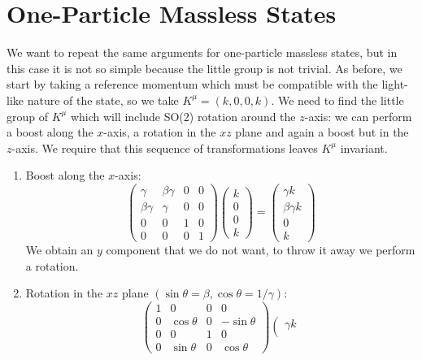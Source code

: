 \documentclass[../main.tex]{subfiles}
\begin{document}
\section{One-Particle Massless States}
We want to repeat the same arguments for one-particle massless states, but in this case it is not so simple because the little group is not trivial. As before, we start by taking a reference momentum which must be compatible with the light-like nature of the state, so we take $K^\mu=(k,0,0,k)$. We need to find the little group of $K^\mu$ which will include SO(2) rotation around the $z$-axis: we can perform a boost along the $x$-axis, a rotation in the $xz$ plane and again a boost but in the $z$-axis. We require that this sequence of transformations leaves $K^\mu$ invariant.
\begin{enumerate}
    \item Boost along the $x$-axis:
    \[
    \left(\begin{array}{cccc}
    \gamma & \beta\gamma & 0 & 0 \\
    \beta\gamma & \gamma & 0 & 0 \\
    0 & 0 & 1 & 0 \\
    0 & 0 & 0 & 1 
    \end{array}\right)
    \left(\begin{array}{c}
    k \\
    0 \\
    0 \\
    k
    \end{array}\right)=
    \left(\begin{array}{c}
    \gamma k \\
    \beta\gamma k \\
    0 \\
    k
    \end{array}\right)
    \]
    We obtain an $y$ component that we do not want, to throw it away we perform a rotation.
    \item Rotation in the $xz$ plane $(\sin\theta=\beta, \cos\theta=1/\gamma)$:
    \[
    \left(\begin{array}{cccc}
    1 & 0 & 0 & 0 \\
    0 & \cos\theta & 0 & -\sin\theta \\
    0 & 0 & 1 & 0 \\
    0 & \sin\theta & 0 & \cos\theta 
    \end{array}\right)
    \left(\begin{array}{c}
    \gamma k \\

\end{array}\]
\end{enumerate}
\end{document}
